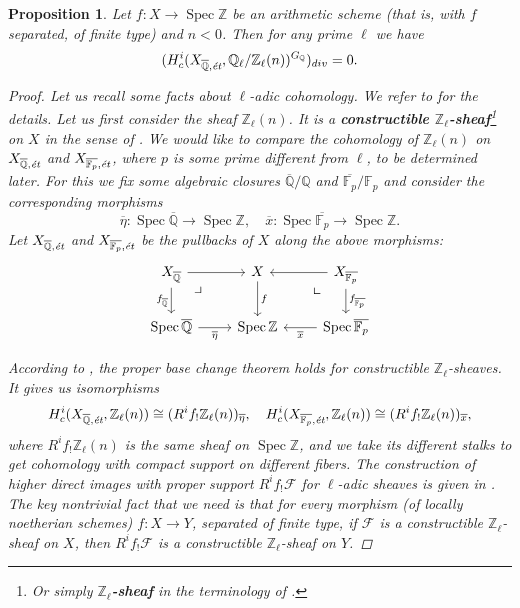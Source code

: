 \documentclass{article}
\DeclareMathOperator{\Spec}{Spec}
\newcommand{\FF}{\mathbb{F}}
\newcommand{\QQ}{\mathbb{Q}}
\newcommand{\ZZ}{\mathbb{Z}}
\newcommand{\tikzpb}{\ar[phantom,pos=0.2]{dr}{\text{\large$\lrcorner$}}}
\newcommand{\tikzpbur}{\ar[phantom,pos=0.2]{dl}{\text{\large$\llcorner$}}}
\newtheorem{proposition}[theorem]{Proposition}
\theoremstyle{definition}
\numberwithin{equation}{section}
\begin{document}
\begin{proposition}
  \label{prop:l-adic-cohomology-key-lemma}
  Let $f\colon X\to \Spec \ZZ$ be an arithmetic scheme (that is, with $f$
  separated, of finite type) and $n < 0$. Then for any prime $\ell$ we have
  $$(H^i_c (X_{\overline{\QQ},\text{\it ét}}, \QQ_\ell/\ZZ_\ell (n))^{G_\QQ})_{div} = 0.$$

  \begin{proof}
    Let us recall some facts about $\ell$-adic cohomology. We refer to
    \cite[Exposé~VI]{SGA5} for the details. Let us first consider the sheaf
    $\ZZ_\ell (n)$. It is a
    \textbf{constructible $\ZZ_\ell$-sheaf}\footnote{Or simply
      \textbf{$\ZZ_\ell$-sheaf} in the terminology of \cite[Rapport]{SGA4-1-2}.}
    on $X$ in the sense of \cite[Exposé~VI, 1.1.1]{SGA5}. We would like to
    compare the cohomology of $\ZZ_\ell (n)$ on
    $X_{\overline{\QQ},\text{\it ét}}$ and $X_{\overline{\FF_p},\text{\it ét}}$,
    where $p$ is some prime different from $\ell$, to be determined later.
    For this we fix some algebraic closures $\overline{\QQ}/\QQ$ and
    $\overline{\FF_p}/\FF_p$ and consider the corresponding morphisms
    \[ \overline{\eta}\colon \Spec \overline{\QQ} \to \Spec \ZZ, \quad
    \overline{x}\colon \Spec \overline{\FF_p} \to \Spec \ZZ. \]
    Let $X_{\overline{\QQ},\text{\it ét}}$ and
    $X_{\overline{\FF_p},\text{\it ét}}$ be the pullbacks of $X$ along the above
    morphisms:
    \[ \begin{tikzcd}
      X_{\overline{\QQ}} \ar{r}\tikzpb\ar{d}[swap]{f_{\overline{\QQ}}} & X \ar{d}{f} & X_{\overline{\FF_p}} \ar{l}\ar{d}{f_{\overline{\FF_p}}}\tikzpbur \\
      \Spec \overline{\QQ} \ar{r}[swap]{\overline{\eta}} & \Spec \ZZ & \Spec \overline{\FF_p} \ar{l}{\overline{x}}
    \end{tikzcd} \]

    According to \cite[Exposé~VI, 2.2.3]{SGA5}, the proper base change theorem
    holds for constructible $\ZZ_\ell$-sheaves. It gives us isomorphisms
    \[ H^i_c (X_{\overline{\QQ}, \text{\it ét}}, \ZZ_\ell (n)) \cong (R^i f_! \ZZ_\ell (n))_{\overline{\eta}}, \quad
    H^i_c (X_{\overline{\FF_p}, \text{\it ét}}, \ZZ_\ell (n)) \cong (R^i f_! \ZZ_\ell (n))_{\overline{x}}, \]
    where $R^i f_! \ZZ_\ell (n)$ is the same sheaf on $\Spec \ZZ$, and we take
    its different stalks to get cohomology with compact support on different
    fibers. The construction of higher direct images with proper support
    $R^i f_! \mathcal{F}$ for $\ell$-adic sheaves is given in
    \cite[Exposé~VI, \S 2.2]{SGA5}. The key nontrivial fact that we need is that
    for every morphism (of locally noetherian schemes) $f\colon X\to Y$,
    separated of finite type, if $\mathcal{F}$ is a constructible
    $\ZZ_\ell$-sheaf on $X$, then $R^i f_! \mathcal{F}$ is a constructible
    $\ZZ_\ell$-sheaf on $Y$.


\end{proof}
\end{proposition}
\end{document}
